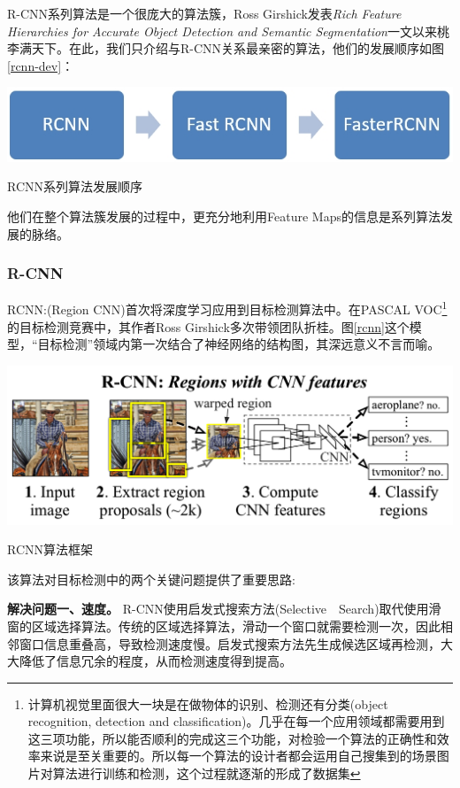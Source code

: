 R-CNN系列算法是一个很庞大的算法簇，Ross Girshick发表\textit{Rich Feature Hierarchies for Accurate Object Detection and Semantic Segmentation}\cite{rcnn}一文以来桃李满天下。在此，我们只介绍与R-CNN关系最亲密的算法，他们的发展顺序如图\ref{rcnn-dev}：
\begin{uscfigure}
	\includegraphics[width=\textwidth]{./Pictures/rcnn.jpg}	
	\caption{RCNN系列算法发展顺序}
	\label{rcnn-dev}
\end{uscfigure}

\par \noindent
他们在整个算法簇发展的过程中，更充分地利用Feature Maps的信息是系列算法发展的脉络。
\subsubsection{R-CNN}
RCNN:(Region CNN)\cite{rcnn}首次将深度学习应用到目标检测算法中。在PASCAL VOC\footnote{计算机视觉里面很大一块是在做物体的识别、检测还有分类(object recognition, detection and classification)。几乎在每一个应用领域都需要用到这三项功能，所以能否顺利的完成这三个功能，对检验一个算法的正确性和效率来说是至关重要的。所以每一个算法的设计者都会运用自己搜集到的场景图片对算法进行训练和检测，这个过程就逐渐的形成了数据集}的目标检测竞赛中，其作者Ross Girshick多次带领团队折桂。图\ref{rcnn}这个模型，“目标检测”领域内第一次结合了神经网络的结构图，其深远意义不言而喻。
\begin{uscfigure}
	\includegraphics[width=\textwidth]{./Pictures/rcnn-regions_with_cnn_features.png}	
	\caption{RCNN算法框架}
	\label{rcnn}
\end{uscfigure}
该算法对目标检测中的两个关键问题提供了重要思路:

\textbf{解决问题一、速度。}
R-CNN使用启发式搜索方法(Selective　Search\cite{ss})取代使用滑窗的区域选择算法。传统的区域选择算法，滑动一个窗口就需要检测一次，因此相邻窗口信息重叠高，导致检测速度慢。启发式搜索方法先生成候选区域再检测，大大降低了信息冗余的程度，从而检测速度得到提高。

